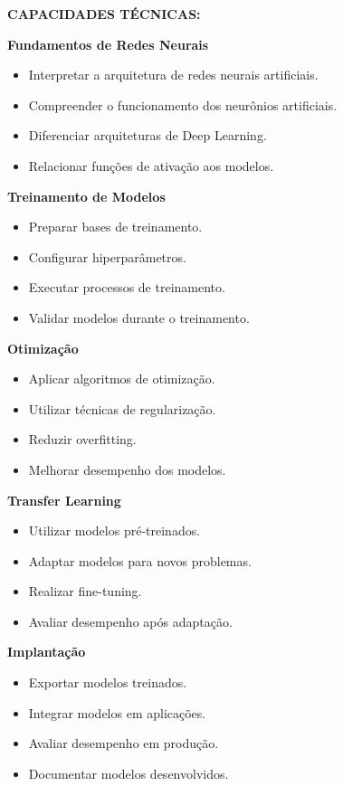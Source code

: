 \textbf{CAPACIDADES TÉCNICAS:}

\textbf{Fundamentos de Redes Neurais}

\begin{itemize}
\item Interpretar a arquitetura de redes neurais artificiais.
\item Compreender o funcionamento dos neurônios artificiais.
\item Diferenciar arquiteturas de Deep Learning.
\item Relacionar funções de ativação aos modelos.
\end{itemize}

\textbf{Treinamento de Modelos}

\begin{itemize}
\item Preparar bases de treinamento.
\item Configurar hiperparâmetros.
\item Executar processos de treinamento.
\item Validar modelos durante o treinamento.
\end{itemize}

\textbf{Otimização}

\begin{itemize}
\item Aplicar algoritmos de otimização.
\item Utilizar técnicas de regularização.
\item Reduzir overfitting.
\item Melhorar desempenho dos modelos.
\end{itemize}

\textbf{Transfer Learning}

\begin{itemize}
\item Utilizar modelos pré-treinados.
\item Adaptar modelos para novos problemas.
\item Realizar fine-tuning.
\item Avaliar desempenho após adaptação.
\end{itemize}

\textbf{Implantação}

\begin{itemize}
\item Exportar modelos treinados.
\item Integrar modelos em aplicações.
\item Avaliar desempenho em produção.
\item Documentar modelos desenvolvidos.
\end{itemize}

